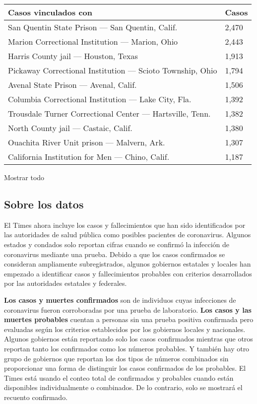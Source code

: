 \begin{longtable}[]{@{}ll@{}}
\toprule
Casos vinculados con & Casos\tabularnewline
\midrule
\endhead
San Quentin State Prison --- San Quentin, Calif. & 2,470 \tabularnewline
Marion Correctional Institution --- Marion, Ohio & 2,443 \tabularnewline
Harris County jail --- Houston, Texas & 1,913 \tabularnewline
Pickaway Correctional Institution --- Scioto Township, Ohio & 1,794
\tabularnewline
Avenal State Prison --- Avenal, Calif. & 1,506 \tabularnewline
Columbia Correctional Institution --- Lake City, Fla. & 1,392
\tabularnewline
Trousdale Turner Correctional Center --- Hartsville, Tenn. & 1,382
\tabularnewline
North County jail --- Castaic, Calif. & 1,380 \tabularnewline
Ouachita River Unit prison --- Malvern, Ark. & 1,307 \tabularnewline
California Institution for Men --- Chino, Calif. & 1,187 \tabularnewline
\bottomrule
\end{longtable}

Mostrar todo

\hypertarget{sobre-los-datos}{%
\subsection{Sobre los datos}\label{sobre-los-datos}}

El Times ahora incluye los casos y fallecimientos que han sido
identificados por las autoridades de salud pública como posibles
pacientes de coronavirus. Algunos estados y condados solo reportan
cifras cuando se confirmó la infección de coronavirus mediante una
prueba. Debido a que los casos confirmados se consideran ampliamente
subregistrados, algunos gobiernos estatales y locales han empezado a
identificar casos y fallecimientos probables con criterios desarrollados
por las autoridades estatales y federales.

\textbf{Los casos y muertes confirmados} son de individuos cuyas
infecciones de coronavirus fueron corroboradas por una prueba de
laboratorio. \textbf{Los casos y las muertes probables} cuentan a
personas sin una prueba positiva confirmada pero evaluadas según los
criterios establecidos por los gobiernos locales y nacionales. Algunos
gobiernos están reportando solo los casos confirmados mientras que otros
reportan tanto los confirmados como los números probables. Y también hay
otro grupo de gobiernos que reportan los dos tipos de números combinados
sin proporcionar una forma de distinguir los casos confirmados de los
probables. El Times está usando el conteo total de confirmados y
probables cuando están disponibles individualmente o combinados. De lo
contrario, solo se mostrará el recuento confirmado.

